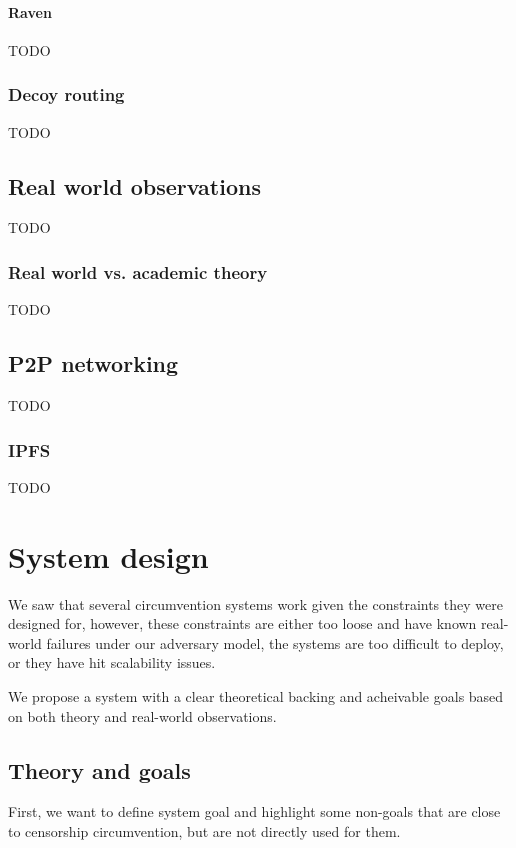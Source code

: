 \documentclass[12pt]{report}
\begin{document}
\subsubsection{Raven}

TODO

\subsection{Decoy routing}

TODO

\section{Real world observations}

TODO

\subsection{Real world vs. academic theory}

TODO

\section{P2P networking}

TODO

\subsection{IPFS}

TODO

\chapter{System design}

We saw that several circumvention systems work given the constraints they were designed for, however, these constraints are either too loose and have known real-world failures under our adversary model, the systems are too difficult to deploy, or they have hit scalability issues.

We propose a system with a clear theoretical backing and acheivable goals based on both theory and real-world observations.

\section{Theory and goals}

First, we want to define system goal and highlight some non-goals that are close to censorship circumvention, but are not directly used for them.
\end{document}

